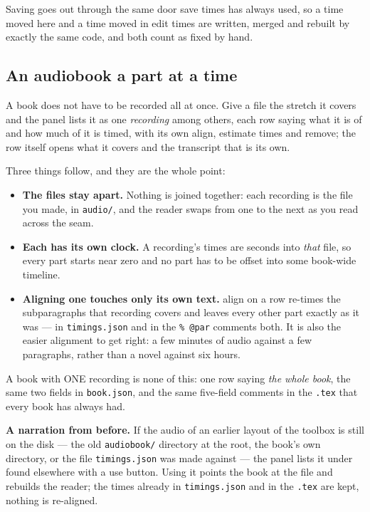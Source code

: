 \documentclass[11pt,oneside]{report}
\newcommand{\file}[1]{\texttt{#1}}
\newcommand{\menu}[1]{\textsf{#1}}
\begin{document}
Saving goes out through the same door \menu{save times} has always used, so
a time moved here and a time moved in \menu{edit times} are written, merged
and rebuilt by exactly the same code, and both count as fixed by hand.

\subsection*{An audiobook a part at a time}
\label{sec:parts}

A book does not have to be recorded all at once. Give a file the stretch it
covers and the panel lists it as one \emph{recording} among others, each row
saying what it is of and how much of it is timed, with its own
\menu{align}, \menu{estimate times} and \menu{remove}; the row itself opens
what it covers and the transcript that is its own.

Three things follow, and they are the whole point:

\begin{itemize}
\item \textbf{The files stay apart.} Nothing is joined together: each
  recording is the file you made, in \file{audio/}, and the reader swaps
  from one to the next as you read across the seam.
\item \textbf{Each has its own clock.} A recording's times are seconds into
  \emph{that} file, so every part starts near zero and no part has to be
  offset into some book-wide timeline.
\item \textbf{Aligning one touches only its own text.} \menu{align} on a row
  re-times the subparagraphs that recording covers and leaves every other
  part exactly as it was --- in \file{timings.json} and in the \verb|% @par|
  comments both. It is also the easier alignment to get right: a few minutes
  of audio against a few paragraphs, rather than a novel against six hours.
\end{itemize}

A book with ONE recording is none of this: one row saying \emph{the whole
book}, the same two fields in \file{book.json}, and the same five-field
comments in the \file{.tex} that every book has always had.

\textbf{A narration from before.} If the audio of an earlier layout of the
toolbox is still on the disk --- the old \file{audiobook/} directory at the
root, the book's own directory, or the file \file{timings.json} was made
against --- the panel lists it under \menu{found elsewhere} with a \menu{use} button.
Using it points the book at the file and rebuilds the reader; the times
already in \file{timings.json} and in the \file{.tex} are kept, nothing is
re-aligned.
\end{document}
